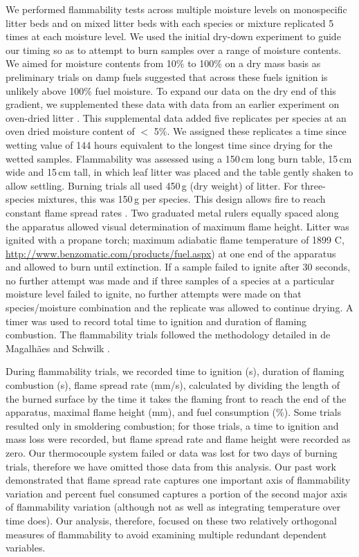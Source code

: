 \documentclass[letterpaper,12pt]{article}
\begin{document}
We performed flammability tests across multiple moisture levels on monospecific
litter beds and on mixed litter beds with each species or mixture replicated 5
times at each moisture level. We used the initial dry-down experiment to guide
our timing so as to attempt to burn samples over a range of moisture contents.
We aimed for moisture contents from 10\% to 100\% on a dry mass basis as
preliminary trials on damp fuels suggested that across these fuels ignition is
unlikely above 100\% fuel moisture. To expand our data on the dry end of this
gradient, we supplemented these data with data from an earlier experiment on
oven-dried litter \citep{Magalhaes+Schwilk-2012}. This supplemental data added
five replicates per species at an oven dried moisture content of $<$ 5\%. We
assigned these replicates a time since wetting value of 144 hours equivalent to
the longest time since drying for the wetted samples. Flammability was assessed
using a 150\,cm long burn table, 15\,cm wide and 15\,cm tall, in which leaf
litter was placed and the table gently shaken to allow settling. Burning trials
all used 450\,g (dry weight) of litter. For three-species mixtures, this was
150\,g per species. This design allows fire to reach constant flame spread
rates \citep{Magalhaes+Schwilk-2012}. Two graduated metal rulers equally spaced
along the apparatus allowed visual determination of maximum flame height.
Litter was ignited with a propane torch; maximum adiabatic flame temperature of
1899 C, \url{http://www.benzomatic.com/products/fuel.aspx}) at one end of the
apparatus and allowed to burn until extinction. If a sample failed to ignite
after 30 seconds, no further attempt was made and if three samples of a species
at a particular moisture level failed to ignite, no further attempts were made
on that species/moisture combination and the replicate was allowed to continue
drying. A timer was used to record total time to ignition and duration of
flaming combustion. The flammability trials followed the methodology detailed
in de Magalhães and Schwilk \citep{Magalhaes+Schwilk-2012}.
 
During flammability trials, we recorded time to ignition (s), duration of
flaming combustion (s), flame spread rate (mm/s), calculated by dividing the
length of the burned surface by the time it takes the flaming front to reach
the end of the apparatus, maximal flame height (mm), and fuel consumption (\%).
Some trials resulted only in smoldering combustion; for those trials, a time to
ignition and mass loss were recorded, but flame spread rate and flame height
were recorded as zero. Our thermocouple system failed or data was lost for two
days of burning trials, therefore we have omitted those data from this
analysis. Our past work \citep{Magalhaes+Schwilk-2012} demonstrated that flame
spread rate captures one important axis of flammability variation
\citep{Schwilk-2015, Pausas+Keeley+etal-2017} and percent fuel consumed
captures a portion of the second major axis of flammability variation (although
not as well as integrating temperature over time does). Our analysis,
therefore, focused on these two relatively orthogonal measures of flammability
to avoid examining multiple redundant dependent variables.
\end{document}
